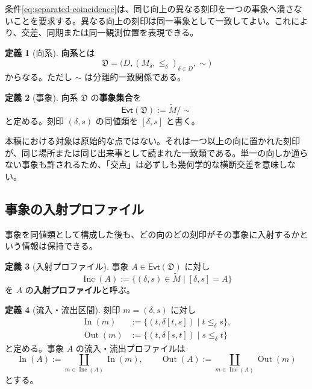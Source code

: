 \documentclass[a4paper,11pt]{ltjsarticle}
\theoremstyle{definition}
\newtheorem{definition}{定義}[section]
\theoremstyle{plain}
\newcommand{\Evt}{\mathsf{Evt}}
\newcommand{\Inc}{\operatorname{Inc}}
\newcommand{\In}{\operatorname{In}}
\newcommand{\Out}{\operatorname{Out}}
\begin{document}
条件\eqref{eq:separated-coincidence}は、同じ向上の異なる刻印を一つの事象へ潰さないことを要求する。異なる向上の刻印は同一事象として一致してよい。これにより、交差、同期または同一観測位置を表現できる。

\begin{definition}[向系]
\textbf{向系}とは
\begin{equation}
 \mathfrak D=
 \bigl(D,(M_\delta,\leq_\delta)_{\delta\in D},\sim\bigr)
 \label{eq:direction-system}
\end{equation}
からなる。ただし $\sim$ は分離的一致関係である。
\end{definition}

\begin{definition}[事象]
向系 $\mathfrak D$ の\textbf{事象集合}を
\begin{equation}
 \Evt(\mathfrak D):=\widetilde M/{\sim}
 \label{eq:event-set}
\end{equation}
と定める。刻印 $(\delta,s)$ の同値類を $[\delta,s]$ と書く。
\end{definition}

本稿における対象は原始的な点ではない。それは一つ以上の向に置かれた刻印が、同じ場所または同じ出来事として読まれた一致類である。単一の向しか通らない事象も許されるため、「交点」は必ずしも幾何学的な横断交差を意味しない。

\subsection{事象の入射プロファイル}

事象を同値類として構成した後も、どの向のどの刻印がその事象に入射するかという情報は保持できる。

\begin{definition}[入射プロファイル]
事象 $A\in\Evt(\mathfrak D)$ に対し
\begin{equation}
 \Inc(A)
 :=\{(\delta,s)\in\widetilde M
       \mid[\delta,s]=A\}
 \label{eq:incidence-profile}
\end{equation}
を $A$ の\textbf{入射プロファイル}と呼ぶ。
\end{definition}

\begin{definition}[流入・流出区間]
刻印 $m=(\delta,s)$ に対し
\begin{align}
 \In(m)
 &:={\{(t,\delta[t,s])\mid t\leq_\delta s\}},
 \label{eq:incoming-profile}\\
 \Out(m)
 &:={\{(t,\delta[s,t])\mid s\leq_\delta t\}}
 \label{eq:outgoing-profile}
\end{align}
と定める。事象 $A$ の流入・流出プロファイルは
\[
 \In(A):=\coprod_{m\in\Inc(A)}\In(m),
 \qquad
 \Out(A):=\coprod_{m\in\Inc(A)}\Out(m)
\]
とする。
\end{definition}
\end{document}
